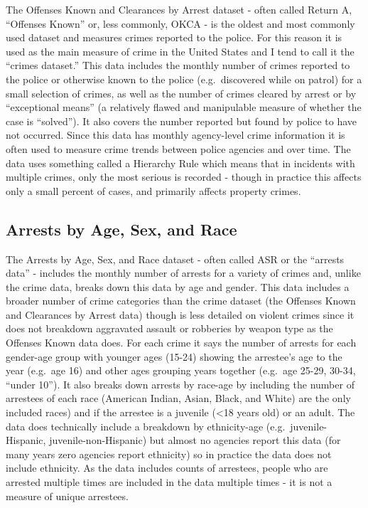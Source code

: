 \documentclass[
  12pt,
  openany]{book}
\begin{document}
The Offenses Known and Clearances by Arrest dataset - often called Return A, ``Offenses Known'' or, less commonly, OKCA - is the oldest and most commonly used dataset and measures crimes reported to the police. For this reason it is used as the main measure of crime in the United States and I tend to call it the ``crimes dataset.'' This data includes the monthly number of crimes reported to the police or otherwise known to the police (e.g.~discovered while on patrol) for a small selection of crimes, as well as the number of crimes cleared by arrest or by ``exceptional means'' (a relatively flawed and manipulable measure of whether the case is ``solved''). It also covers the number reported but found by police to have not occurred. Since this data has monthly agency-level crime information it is often used to measure crime trends between police agencies and over time. The data uses something called a Hierarchy Rule which means that in incidents with multiple crimes, only the most serious is recorded - though in practice this affects only a small percent of cases, and primarily affects property crimes.

\hypertarget{arrests-by-age-sex-and-race}{%
\subsection{Arrests by Age, Sex, and Race}\label{arrests-by-age-sex-and-race}}

The Arrests by Age, Sex, and Race dataset - often called ASR or the ``arrests data'' - includes the monthly number of arrests for a variety of crimes and, unlike the crime data, breaks down this data by age and gender. This data includes a broader number of crime categories than the crime dataset (the Offenses Known and Clearances by Arrest data) though is less detailed on violent crimes since it does not breakdown aggravated assault or robberies by weapon type as the Offenses Known data does. For each crime it says the number of arrests for each gender-age group with younger ages (15-24) showing the arrestee's age to the year (e.g.~age 16) and other ages grouping years together (e.g.~age 25-29, 30-34, ``under 10''). It also breaks down arrests by race-age by including the number of arrestees of each race (American Indian, Asian, Black, and White) are the only included races) and if the arrestee is a juvenile (\textless18 years old) or an adult. The data does technically include a breakdown by ethnicity-age (e.g.~juvenile-Hispanic, juvenile-non-Hispanic) but almost no agencies report this data (for many years zero agencies report ethnicity) so in practice the data does not include ethnicity. As the data includes counts of arrestees, people who are arrested multiple times are included in the data multiple times - it is not a measure of unique arrestees.
\end{document}
